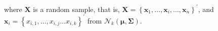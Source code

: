 \noindent where
$\mathbf{X}$
is a random sample,
that is,
$\mathbf{X} = \left\{ \mathbf{x}_1, \dots,  \mathbf{x}_i, \dots, \mathbf{x}_n \right\}^{\prime}$,
and
$\mathbf{x}_{i} = \left\{ x_{i, 1},  \dots, x_{i, j} \dots x_{i, k} \right\}^{\prime}$
from
$\mathcal{N}_k \left( \boldsymbol{\mu}, \boldsymbol{\Sigma} \right)$.